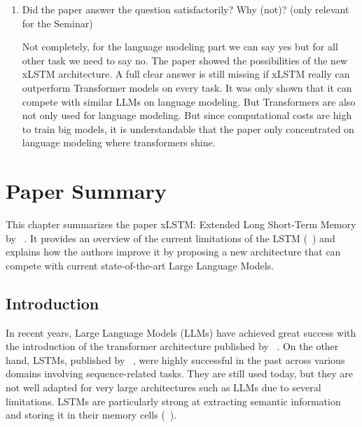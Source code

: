 \documentclass[a4paper,oneside,10pt,ngerman,english]{scrartcl}
\begin{document}
\begin{enumerate}
Since LSTMs are widely used for other tasks than language modeling, xLSTM can have a noticeable impact for other fields like Reinforcement Learning and Time Series Prediction. In some fields LSTM outperforms Transformers as \citeauthor{trafficsignalcontrol}~\cite{trafficsignalcontrol} shows it for traffic signal controls and \citeauthor{egusphere-2025-1706}~\cite{egusphere-2025-1706} showed it for regression tasks and was limited by the LSTM and Transformer architecture. So, xLSTM might be the solution to boost performance further. 

\item Did the paper answer the question satisfactorily? Why (not)? (only relevant for the Seminar)

Not completely, for the language modeling part we can say yes but for all other task we need to say no. The paper showed the possibilities of the new xLSTM architecture. A full clear answer is still missing if xLSTM really can outperform Transformer models on every task. It was only shown that it can compete with similar LLMs on language modeling. But Transformers are also not only used for language modeling. But since computational costs are high to train big models, it is understandable that the paper only concentrated on language modeling where transformers shine.


\end{enumerate}

\section{Paper Summary}
\label{sec:papersummary}

This chapter summarizes the paper xLSTM: Extended Long Short-Term Memory by \citeauthor{beck2024xlstmextendedlongshortterm}~\cite{beck2024xlstmextendedlongshortterm}. It provides an overview of the current limitations of the LSTM (\citeauthor{LSTM}~\cite{LSTM}) and explains how the authors improve it by proposing a new architecture that can compete with current state-of-the-art Large Language Models.

\subsection{Introduction}
\label{sec:introduction}

In recent years, Large Language Models (LLMs) have achieved great success with the introduction of the transformer architecture published by \citeauthor{DBLP:journals/corr/VaswaniSPUJGKP17}~\cite{DBLP:journals/corr/VaswaniSPUJGKP17}. On the other hand, LSTMs, published by \citeauthor{LSTM}~\cite{LSTM}, were highly successful in the past across various domains involving sequence-related tasks. They are still used today, but they are not well adapted for very large architectures such as LLMs due to several limitations. LSTMs are particularly strong at extracting semantic information and storing it in their memory cells (\citeauthor{karpathy}~\cite{karpathy}). 
\end{document}
